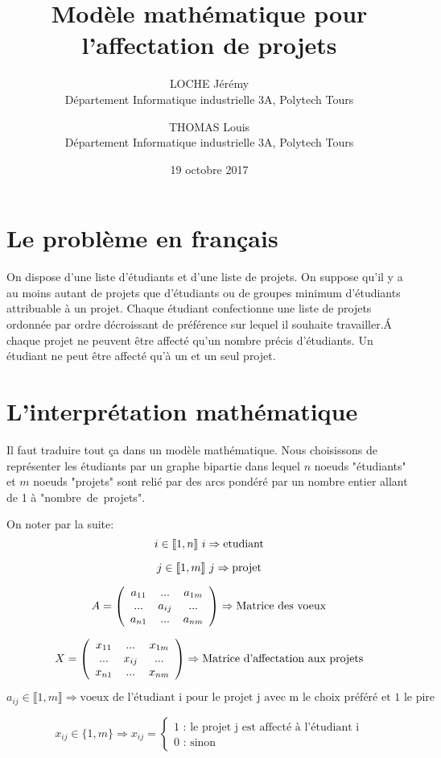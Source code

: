 \documentclass{article}
\title{Modèle mathématique pour l'affectation de projets}
\date{19 octobre 2017}
\author{
LOCHE Jérémy\\ Département Informatique industrielle 3A, Polytech Tours
\and
THOMAS Louis\\ Département Informatique industrielle 3A, Polytech Tours}
\begin{document}
\maketitle

\newpage

\section{Le problème en français}
On dispose d'une liste d'étudiants et d'une liste de projets. On suppose qu'il y a au moins autant de projets que d'étudiants ou de groupes minimum d'étudiants attribuable à un projet. Chaque étudiant confectionne une liste de projets ordonnée par ordre décroissant de préférence sur lequel il souhaite travailler.\' A chaque projet ne peuvent être affecté qu'un nombre précis d'étudiants. Un étudiant ne peut être affecté qu'à un et un seul projet.


\section{L'interprétation mathématique}

Il faut traduire tout ça dans un modèle mathématique. Nous choisissons de représenter les étudiants par un graphe bipartie dans lequel $n$ noeuds "étudiants"  et $m$ noeuds "projets"   sont relié par des arcs pondéré par un nombre entier allant de 1 à "nombre~de~projets".

On noter par la suite:
$$
i \in \llbracket 1,n \rrbracket 
\\
\text{ }
i \Rightarrow \text{etudiant}
$$

$$
j \in \llbracket 1,m \rrbracket 
\\
\text{ }
j \Rightarrow \text{projet}
$$

$$
A=
\left(
\begin{array}{c c c c}
a_{11} & ...        & a_{1m} \\ 
...        & a_{ij}   & ... \\
a_{n1} & ...       & a_{nm} \\
\end{array}
\right)
\Rightarrow \text{Matrice des voeux}
$$

$$
X=
\left(
\begin{array}{c c c c}
x_{11} & ...        & x_{1m} \\ 
...        & x_{ij}   & ... \\
x_{n1} & ...       & x_{nm} \\
\end{array}
\right)
\Rightarrow \text{Matrice d'affectation aux projets}
$$

$$
a_{ij} \in  \llbracket 1,m \rrbracket \Rightarrow \text{voeux de l'étudiant i pour le projet j avec m le choix préféré et 1 le pire}
$$

$$
x_{ij} \in  \lbrace 1,m \rbrace
\Rightarrow
x_{ij}=
\left\lbrace
\begin{array}{l}
1 \text{ : le projet j est affecté à l'étudiant i} \\
0 \text{ : sinon}
\end{array}
\right.
$$
\end{document}
